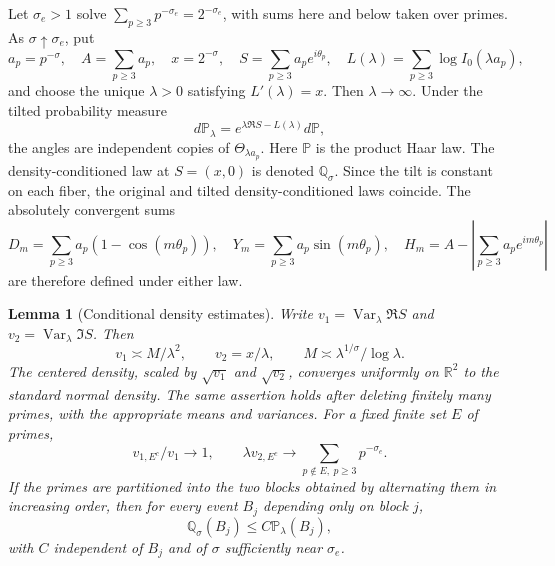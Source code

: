 \documentclass[11pt,a4paper]{article}
\newtheorem{lemma}[theorem]{Lemma}
\theoremstyle{definition}
\theoremstyle{remark}\newtheorem{remark}[theorem]{Remark}
\begin{document}
Let $\sigma_e>1$ solve
$\sum_{p\geq3}p^{-\sigma_e}=2^{-\sigma_e}$, with sums here and below taken
over primes.  As $\sigma\uparrow\sigma_e$, put
\[
 a_p=p^{-\sigma},\quad A=\sum_{p\geq3}a_p,\quad x=2^{-\sigma},\quad
 S=\sum_{p\geq3}a_pe^{i\theta_p},\quad
 L(\lambda)=\sum_{p\geq3}\log I_0(\lambda a_p),
\]
and choose the unique $\lambda>0$ satisfying $L'(\lambda)=x$.
Then $\lambda\to\infty$.  Under the tilted probability measure
\[
 d\mathbb P_\lambda=e^{\lambda\Re S-L(\lambda)}d\mathbb P,
\]
the angles are independent copies of $\Theta_{\lambda a_p}$.
Here $\mathbb P$ is the product Haar law.  The density-conditioned law at
$S=(x,0)$ is denoted $\mathbb Q_\sigma$.  Since the tilt is constant on each
fiber, the original and tilted density-conditioned laws coincide.
The absolutely convergent sums
\[
 D_m=\sum_{p\geq3}a_p(1-\cos(m\theta_p)),\quad
 Y_m=\sum_{p\geq3}a_p\sin(m\theta_p),\quad
 H_m=A-\left|\sum_{p\geq3}a_pe^{im\theta_p}\right|
\]
are therefore defined under either law.

\begin{lemma}[Conditional density estimates]\label{lem:new-condition}
Write $v_1=\operatorname{Var}_\lambda\Re S$ and
$v_2=\operatorname{Var}_\lambda\Im S$.  Then
\[
 v_1\asymp M/\lambda^2,\qquad v_2=x/\lambda,
 \qquad M\asymp\lambda^{1/\sigma}/\log\lambda.
\]
The centered density, scaled by $\sqrt{v_1}$ and $\sqrt{v_2}$, converges
uniformly on $\mathbb R^2$ to the standard normal density.
The same assertion holds after deleting finitely many primes, with the
appropriate means and variances.  For a fixed finite set $E$ of primes,
\[
 v_{1,E^c}/v_1\to1,\qquad
 \lambda v_{2,E^c}\to\sum_{p\notin E,\ p\geq3}p^{-\sigma_e}.
\]
If the primes are partitioned into the two blocks obtained by alternating
them in increasing order, then for every event $B_j$ depending only on
block $j$,
\begin{equation}\label{eq:new-event-domination}
 \mathbb Q_\sigma(B_j)\leq C\mathbb P_\lambda(B_j),
\end{equation}
with $C$ independent of $B_j$ and of $\sigma$ sufficiently near $\sigma_e$.
\end{lemma}
\end{document}
